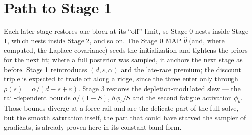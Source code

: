 \documentclass[11pt]{article}
\begin{document}
\section{Path to Stage 1}

Each later stage restores one block at its ``off'' limit, so Stage 0 nests inside Stage 1, which nests inside Stage 2, and so on. The Stage 0 MAP $\hat\theta$ (and, where computed, the Laplace covariance) seeds the initialization and tightens the priors for the next fit; where a full posterior was sampled, it anchors the next stage as before. Stage 1 reintroduces $(d, \varepsilon, \alpha)$ and the late-race premium; the discount triple is expected to trade off along a ridge, since the three enter only through $\rho(s) = \alpha/(d - s + \varepsilon)$. Stage 3 restores the depletion-modulated slew --- the rail-dependent bounds $a/(1-S)$, $b\,\phi_b/S$ and the second fatigue activation $\phi_b$. Those bounds diverge at a force rail and are the delicate part of the full solve, but the smooth saturation itself, the part that could have starved the sampler of gradients, is already proven here in its constant-band form.
\end{document}
